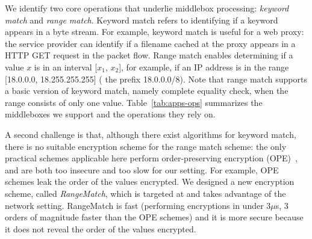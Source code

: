 We identify two core operations that underlie middlebox processing: {\em keyword match} and {\em range match}. Keyword match refers to  identifying if a keyword appears in a byte stream.   For example, keyword match is useful for a web proxy: the service provider can identify if a filename cached at the proxy appears in a HTTP GET request in the packet flow. %
Range match enables determining if a value $x$ is in an interval [$x_1$, $x_2$], for example, if an IP address is in the range [18.0.0.0, 18.255.255.255] (\ie{} the prefix 18.0.0.0/8).
Note that range match supports a basic version of keyword match, namely complete equality check, when the range consists of only one value.
%
Table~\ref{tab:apps-ops} summarizes the middleboxes we support and the operations they rely on. 


A second challenge is that, although there exist algorithms for keyword match, there is no suitable encryption scheme for the range match scheme:
 the only practical schemes applicable here perform order-preserving encryption (OPE)~\cite{boldyreva:ope,popa:mope}, and are both too insecure and too slow for our setting.  For example, OPE schemes leak the order of the values encrypted. We designed a new encryption scheme, called {\em RangeMatch}, which is targeted at and takes advantage of the network setting. RangeMatch  is fast (performing encryptions in under 3$\mu$s, 3 orders of magnitude faster than the OPE schemes) and it is more secure because it does not reveal the order of the values encrypted. 
 
